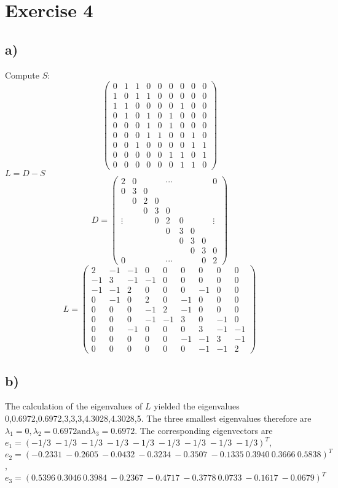 \section*{Exercise 4}
\subsection*{a)}
Compute $S$: 
\[\left(\begin{matrix}
0&1&1&0&0&0&0&0&0\\1&0&1&1&0&0&0&0&0\\1&1&0&0&0&0&1&0&0\\
0&1&0&1&0&1&0&0&0\\0&0&0&1&0&1&0&0&0\\
0&0&0&1&1&0&0&1&0\\0&0&1&0&0&0&0&1&1\\0&0&0&0&0&1&1&0&1\\
0&0&0&0&0&0&1&1&0
\end{matrix}\right)\]
$L=D-S$
\[D=\left(\begin{matrix}
2&0&&&\cdots&&&&0\\
0&3&0\\&0&2&0\\&&0&3&0\\\vdots&&&0&2&0&&&\vdots\\&&&&0&3&0\\&&&&&0&3&0\\&&&&&&0&3&0\\0&&&&\cdots&&&0&2
\end{matrix}\right)\]
\[L=\left(\begin{matrix}
2&-1&-1&0&0&0&0&0&0\\-1&3&-1&-1&0&0&0&0&0\\-1&-1&2&0&0&0&-1&0&0\\
0&-1&0&2&0&-1&0&0&0\\0&0&0&-1&2&-1&0&0&0\\
0&0&0&-1&-1&3&0&-1&0\\0&0&-1&0&0&0&3&-1&-1\\0&0&0&0&0&-1&-1&3&-1\\
0&0&0&0&0&0&-1&-1&2
\end{matrix}\right)\]

\subsection*{b)}
The calculation of the eigenvalues of $L$ yielded the eigenvalues 0,0.6972,0.6972,3,3,3,4.3028,4.3028,5.
The three smallest eigenvalues therefore are $\lambda_1=0,\lambda_2=0.6972 \text{and} \lambda_3=0.6972$.
The corresponding eigenvectors are \\$e_1 = (-1/3\;-1/3\;-1/3\;-1/3\;-1/3\;-1/3\;-1/3\;-1/3\;-1/3)^T$, $e_2=(-0.2331\:-0.2605\:-0.0432\:-0.3234\:-0.3507\:-0.1335\:0.3940\:0.3666\:0.5838)^T$, $e_3 = (0.5396\:0.3046\:0.3984\:-0.2367\:-0.4717\:-0.3778\:0.0733\:-0.1617\:-0.0679)^T$

